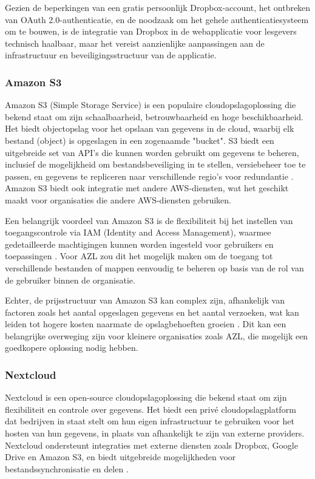 Gezien de beperkingen van een gratis persoonlijk Dropbox-account, het ontbreken van OAuth 2.0-authenticatie, en de noodzaak om het gehele authenticatiesysteem 
om te bouwen, is de integratie van Dropbox in de webapplicatie voor lesgevers technisch haalbaar, maar het vereist aanzienlijke aanpassingen aan de infrastructuur 
en beveiligingsstructuur van de applicatie.

\subsubsection{Amazon S3}
Amazon S3 (Simple Storage Service) is een populaire cloudopslagoplossing die bekend staat om zijn schaalbaarheid, betrouwbaarheid en hoge beschikbaarheid. Het biedt objectopslag voor het opslaan van gegevens in de cloud, waarbij elk bestand (object) is opgeslagen in een zogenaamde "bucket". S3 biedt een uitgebreide set van API's die kunnen worden gebruikt om gegevens te beheren, inclusief de mogelijkheid om bestandsbeveiliging in te stellen, versiebeheer toe te passen, en gegevens te repliceren naar verschillende regio's voor redundantie \autocite{aws_s3}. Amazon S3 biedt ook integratie met andere AWS-diensten, wat het geschikt maakt voor organisaties die andere AWS-diensten gebruiken.

Een belangrijk voordeel van Amazon S3 is de flexibiliteit bij het instellen van toegangscontrole via IAM (Identity and Access Management), waarmee gedetailleerde machtigingen kunnen worden ingesteld voor gebruikers en toepassingen \autocite{aws_iam}. Voor AZL zou dit het mogelijk maken om de toegang tot verschillende bestanden of mappen eenvoudig te beheren op basis van de rol van de gebruiker binnen de organisatie.

Echter, de prijsstructuur van Amazon S3 kan complex zijn, afhankelijk van factoren zoals het aantal opgeslagen gegevens en het aantal verzoeken, wat kan leiden tot hogere kosten naarmate de opslagbehoeften groeien \autocite{aws_pricing}. Dit kan een belangrijke overweging zijn voor kleinere organisaties zoals AZL, die mogelijk een goedkopere oplossing nodig hebben.

\subsubsection{Nextcloud}
Nextcloud is een open-source cloudopslagoplossing die bekend staat om zijn flexibiliteit en controle over gegevens. Het biedt een privé cloudopslagplatform dat bedrijven in staat stelt om hun eigen infrastructuur te gebruiken voor het hosten van hun gegevens, in plaats van afhankelijk te zijn van externe providers. Nextcloud ondersteunt integraties met externe diensten zoals Dropbox, Google Drive en Amazon S3, en biedt uitgebreide mogelijkheden voor bestandssynchronisatie en delen \autocite{nextcloud_features}.


